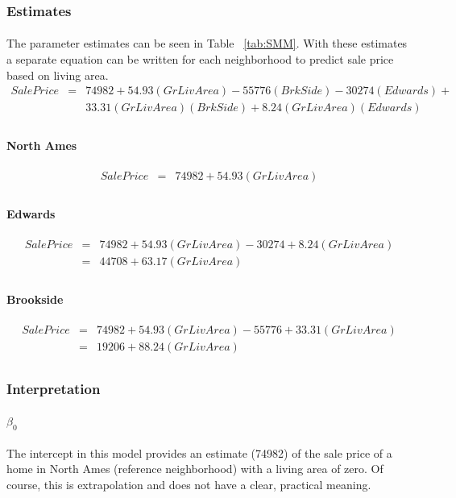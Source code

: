 \documentclass[11pt]{scrartcl} %
\begin{document}
\subsubsection{Estimates}
\paragraph{} The parameter estimates can be seen in Table ~\ref{tab:SMM}. With these estimates a separate equation can be written for each neighborhood to predict sale price based on living area.
\begin{eqnarray*}
SalePrice &=& 74982 + 54.93(GrLivArea) - 55776(BrkSide) - 30274(Edwards) + \\
& & 33.31(GrLivArea)(BrkSide) + 8.24(GrLivArea)(Edwards)\\
\end{eqnarray*}
\paragraph{North Ames}
\begin{eqnarray*}
SalePrice &=& 74982 + 54.93(GrLivArea)\\
\end{eqnarray*}
\paragraph{Edwards}
\begin{eqnarray*}
SalePrice &=& 74982 + 54.93(GrLivArea) - 30274 + 8.24(GrLivArea)\\
&=& 44708 + 63.17(GrLivArea)\\
\end{eqnarray*}
\paragraph{Brookside}
\begin{eqnarray*}
SalePrice &=& 74982 + 54.93(GrLivArea) - 55776 + 33.31(GrLivArea)\\
&=& 19206 + 88.24(GrLivArea)\\
\end{eqnarray*}
\subsubsection{Interpretation}
\paragraph{$\beta_0$}The intercept in this model provides an estimate (74982) of the sale price of a home in North Ames (reference neighborhood) with a living area of zero. Of course, this is extrapolation and does not have a clear, practical meaning.
\end{document}
